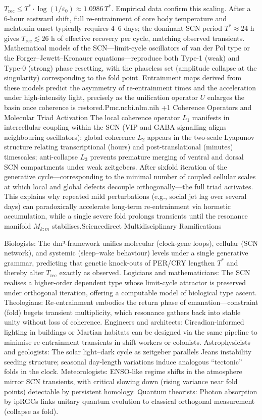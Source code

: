 $   T_{\text{rec}} \le T^* \cdot \log(1/\varepsilon_0) \approx 1.0986 \, T^*.   $
Empirical data confirm this scaling. After a 6-hour eastward shift, full re-entrainment of core body temperature and melatonin onset typically requires 4–6 days; the dominant SCN period $  T^* \approx 24  $ h gives $  T_{\text{rec}} \lesssim 26  $ h of effective recovery per cycle, matching observed transients. Mathematical models of the SCN—limit-cycle oscillators of van der Pol type or the Forger–Jewett–Kronauer equations—reproduce both Type-1 (weak) and Type-0 (strong) phase resetting, with the phaseless set (amplitude collapse at the singularity) corresponding to the fold point. Entrainment maps derived from these models predict the asymmetry of re-entrainment times and the acceleration under high-intensity light, precisely as the unification operator $  U  $ enlarges the basin once coherence is restored.⁠Pmc.ncbi.nlm.nih +1
Coherence Operators and Molecular Triad Activation
The local coherence operator $  L_1  $ manifests in intercellular coupling within the SCN (VIP and GABA signalling aligns neighbouring oscillators); global coherence $  L_2  $ appears in the two-scale Lyapunov structure relating transcriptional (hours) and post-translational (minutes) timescales; anti-collapse $  L_3  $ prevents premature merging of ventral and dorsal SCN compartments under weak zeitgebers. After sixfold iteration of the generative cycle—corresponding to the minimal number of coupled cellular scales at which local and global defects decouple orthogonally—the full triad activates. This explains why repeated mild perturbations (e.g., social jet lag over several days) can paradoxically accelerate long-term re-entrainment via hormetic accumulation, while a single severe fold prolongs transients until the resonance manifold $  M_{k:m}  $ stabilises.⁠Sciencedirect
Multidisciplinary Ramifications

Biologists: The dm³-framework unifies molecular (clock-gene loops), cellular (SCN network), and systemic (sleep–wake behaviour) levels under a single generative grammar, predicting that genetic knock-outs of PER/CRY lengthen $  T^*  $ and thereby alter $  T_{\text{rec}}  $ exactly as observed.
Logicians and mathematicians: The SCN realises a higher-order dependent type whose limit-cycle attractor is preserved under orthogonal iteration, offering a computable model of biological type ascent.
Theologians: Re-entrainment embodies the return phase of emanation—constraint (fold) begets transient multiplicity, which resonance gathers back into stable unity without loss of coherence.
Engineers and architects: Circadian-informed lighting in buildings or Martian habitats can be designed via the same pipeline to minimise re-entrainment transients in shift workers or colonists.
Astrophysicists and geologists: The solar light–dark cycle as zeitgeber parallels Jeans instability seeding structure; seasonal day-length variations induce analogous “tectonic” folds in the clock.
Meteorologists: ENSO-like regime shifts in the atmosphere mirror SCN transients, with critical slowing down (rising variance near fold points) detectable by persistent homology.
Quantum theorists: Photon absorption by ipRGCs links unitary quantum evolution to classical orthogonal measurement (collapse as fold).

